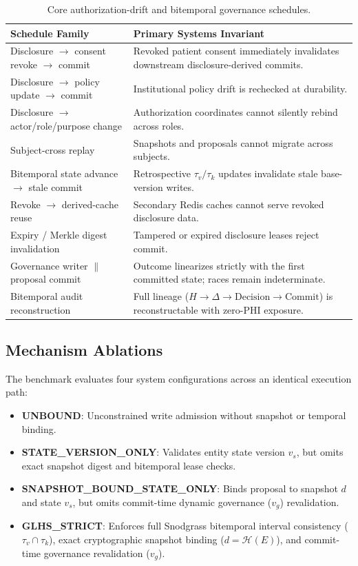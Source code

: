 \documentclass[conference]{IEEEtran}
\begin{document}
\begin{table}[t]
\caption{Core authorization-drift and bitemporal governance schedules.}
\label{tab:schedules}
\centering
\scriptsize
\setlength{\tabcolsep}{2pt}
\begin{tabular}{p{}p{}}
\toprule
\textbf{Schedule Family} & \textbf{Primary Systems Invariant} \\
\midrule
Disclosure $\to$ consent revoke $\to$ commit & Revoked patient consent immediately invalidates downstream disclosure-derived commits. \\
Disclosure $\to$ policy update $\to$ commit & Institutional policy drift is rechecked at durability. \\
Disclosure $\to$ actor/role/purpose change & Authorization coordinates cannot silently rebind across roles. \\
Subject-cross replay & Snapshots and proposals cannot migrate across subjects. \\
Bitemporal state advance $\to$ stale commit & Retrospective $\tau_v/\tau_k$ updates invalidate stale base-version writes. \\
Revoke $\to$ derived-cache reuse & Secondary Redis caches cannot serve revoked disclosure data. \\
Expiry / Merkle digest invalidation & Tampered or expired disclosure leases reject commit. \\
Governance writer $\parallel$ proposal commit & Outcome linearizes strictly with the first committed state; races remain indeterminate. \\
Bitemporal audit reconstruction & Full lineage ($H \to \Delta \to \text{Decision} \to \text{Commit}$) is reconstructable with zero-PHI exposure. \\
\bottomrule
\end{tabular}
\end{table}

\subsection{Mechanism Ablations}
The benchmark evaluates four system configurations across an identical execution path:
\begin{itemize}
\item \textbf{UNBOUND}: Unconstrained write admission without snapshot or temporal binding.
\item \textbf{STATE\_VERSION\_ONLY}: Validates entity state version $v_s$, but omits exact snapshot digest and bitemporal lease checks.
\item \textbf{SNAPSHOT\_BOUND\_STATE\_ONLY}: Binds proposal to snapshot $d$ and state $v_s$, but omits commit-time dynamic governance ($v_g$) revalidation.
\item \textbf{GLHS\_STRICT}: Enforces full Snodgrass bitemporal interval consistency ($\tau_v \cap \tau_k$), exact cryptographic snapshot binding ($d = \mathcal{H}(E)$), and commit-time governance revalidation ($v_g$).
\end{itemize}
\end{document}
